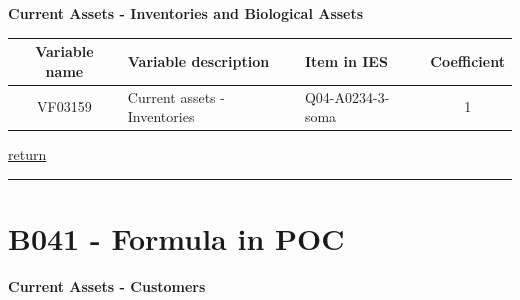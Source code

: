 \documentclass[]{book}
\begin{document}
\textbf{Current Assets - Inventories and Biological Assets}

\begin{longtable}[]{@{}cllc@{}}
\toprule
Variable name & Variable description & Item in IES & Coefficient\tabularnewline
\midrule
\endhead
VF03159 & Current assets - Inventories & Q04-A0234-3-soma & 1\tabularnewline
\bottomrule
\end{longtable}

\protect\hyperlink{assets}{return}

\begin{center}\rule{0.5\linewidth}{\linethickness}\end{center}

\hypertarget{b041---formula-in-poc}{%
\section{B041 - Formula in POC}\label{b041---formula-in-poc}}

\textbf{Current Assets - Customers}
\end{document}
